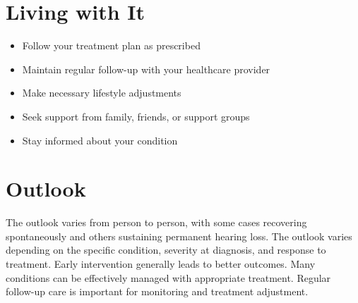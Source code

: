 \section{Living with It}
\begin{itemize}[noitemsep]
  \item Follow your treatment plan as prescribed
  \item Maintain regular follow-up with your healthcare provider
  \item Make necessary lifestyle adjustments
  \item Seek support from family, friends, or support groups
  \item Stay informed about your condition
\end{itemize}
\section{Outlook}
The outlook varies from person to person, with some cases recovering spontaneously and others sustaining permanent hearing loss. The outlook varies depending on the specific condition, severity at diagnosis, and response to treatment. Early intervention generally leads to better outcomes. Many conditions can be effectively managed with appropriate treatment. Regular follow-up care is important for monitoring and treatment adjustment.
